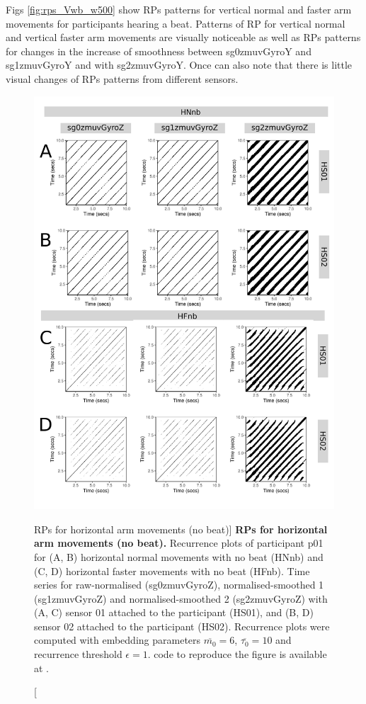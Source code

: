 Figs \ref{fig:rps_Vwb_w500} show RPs patterns for vertical normal and 
faster arm movements for participants hearing a beat. 
Patterns of RP for vertical normal and vertical faster arm movements are 
visually noticeable as well as RPs patterns for changes in 
the increase of smoothness between sg0zmuvGyroY and sg1zmuvGyroY and 
with sg2zmuvGyroY. Once can also note that there is little visual 
changes of RPs patterns from different sensors.
\begin{figure}
\centering
\includegraphics[height=0.8\textheight]{fig_5_09}
\caption
	[RPs for horizontal arm movements (no beat)]{
	{\bf RPs for horizontal arm movements (no beat).}	
	Recurrence plots of participant p01 for 
	(A, B) horizontal normal movements with no beat (HNnb) and
	(C, D) horizontal faster movements with no beat (HFnb).
	Time series for raw-normalised (sg0zmuvGyroZ), 
	normalised-smoothed 1 (sg1zmuvGyroZ) and 
	normalised-smoothed 2 (sg2zmuvGyroZ) with
	(A, C) sensor 01 attached to the participant (HS01), and
	(B, D) sensor 02 attached to the participant (HS02).
	Recurrence plots were computed with 
	embedding parameters $\overline{m_0}=6$, $\overline{\tau_0}=10$ and 
	recurrence threshold $\epsilon=1$.
	\R code to reproduce the figure is available at 
	.
        }
    \label{fig:rps_Hnb_w500}
\end{figure}
